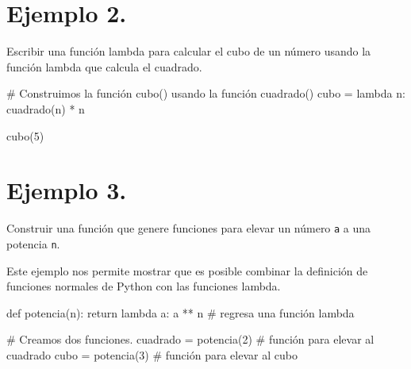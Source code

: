 \documentclass[
  letterpaper,
  DIV=11,
  numbers=noendperiod]{scrreprt}
\newenvironment{Shaded}{\begin{snugshade}}{\end{snugshade}}
\newcommand{\CommentTok}[1]{\textcolor[rgb]{0.37,0.37,0.37}{#1}}
\newcommand{\ControlFlowTok}[1]{\textcolor[rgb]{0.00,0.23,0.31}{#1}}
\newcommand{\DecValTok}[1]{\textcolor[rgb]{0.68,0.00,0.00}{#1}}
\newcommand{\KeywordTok}[1]{\textcolor[rgb]{0.00,0.23,0.31}{#1}}
\newcommand{\NormalTok}[1]{\textcolor[rgb]{0.00,0.23,0.31}{#1}}
\newcommand{\OperatorTok}[1]{\textcolor[rgb]{0.37,0.37,0.37}{#1}}
\begin{document}
\section{\texorpdfstring{\textbf{Ejemplo
2.}}{Ejemplo 2.}}\label{ejemplo-2.}

Escribir una función lambda para calcular el cubo de un número usando la
función lambda que calcula el cuadrado.

\begin{Shaded}
\begin{Highlighting}[]
\CommentTok{\# Construimos la función cubo() usando la función cuadrado()}
\NormalTok{cubo }\OperatorTok{=} \KeywordTok{lambda}\NormalTok{ n: cuadrado(n) }\OperatorTok{*}\NormalTok{ n}
\end{Highlighting}
\end{Shaded}

\begin{Shaded}
\begin{Highlighting}[]
\NormalTok{cubo(}\DecValTok{5}\NormalTok{)}
\end{Highlighting}
\end{Shaded}

\section{\texorpdfstring{\textbf{Ejemplo
3.}}{Ejemplo 3.}}\label{ejemplo-3.}

Construir una función que genere funciones para elevar un número
\texttt{a} a una potencia \texttt{n}.

Este ejemplo nos permite mostrar que es posible combinar la definición
de funciones normales de Python con las funciones lambda.

\begin{Shaded}
\begin{Highlighting}[]
\KeywordTok{def}\NormalTok{ potencia(n):}
    \ControlFlowTok{return} \KeywordTok{lambda}\NormalTok{ a: a }\OperatorTok{**}\NormalTok{ n }\CommentTok{\# regresa una función lambda}
\end{Highlighting}
\end{Shaded}

\begin{Shaded}
\begin{Highlighting}[]
\CommentTok{\# Creamos dos funciones.}
\NormalTok{cuadrado }\OperatorTok{=}\NormalTok{ potencia(}\DecValTok{2}\NormalTok{) }\CommentTok{\# función para elevar al cuadrado}
\NormalTok{cubo }\OperatorTok{=}\NormalTok{ potencia(}\DecValTok{3}\NormalTok{) }\CommentTok{\# función para elevar al cubo}
\end{Highlighting}
\end{Shaded}
\end{document}
